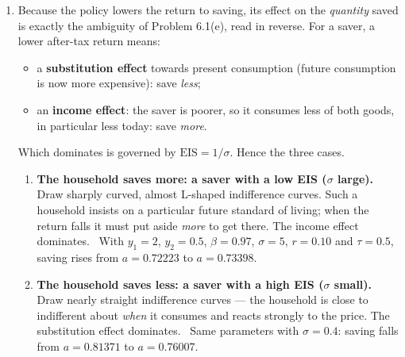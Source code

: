 \documentclass[12pt, letterpaper]{article}
\begin{document}
\begin{tcolorbox}[evenbox,title={Problem 6.6 \quad A Tax on Savings}]
\begin{enumerate}
\item Because the policy lowers the return to saving, its effect on the \emph{quantity}
saved is exactly the ambiguity of Problem 6.1(e), read in reverse. For a saver, a lower
after-tax return means:
\begin{itemize}[leftmargin=1.3em,itemsep=2pt,topsep=3pt]
\item a \textbf{substitution effect} towards present consumption (future consumption is now
      more expensive): save \emph{less};
\item an \textbf{income effect}: the saver is poorer, so it consumes less of both goods, in
      particular less today: save \emph{more}.
\end{itemize}
Which dominates is governed by $\mathrm{EIS}=1/\sigma$. Hence the three cases.

\begin{enumerate}[label=(\roman*),leftmargin=1.9em,itemsep=5pt,topsep=4pt]
\item \textbf{The household saves more: a saver with a low EIS ($\sigma$ large).} Draw
      sharply curved, almost L-shaped indifference curves. Such a household insists on a
      particular future standard of living; when the return falls it must put aside
      \emph{more} to get there. The income effect dominates.
      \checkmark\ With $y_1=2$, $y_2=0.5$, $\beta=0.97$, $\sigma=5$, $r=0.10$ and
      $\tau=0.5$, saving rises from $a=0.72223$ to $a=0.73398$.

\item \textbf{The household saves less: a saver with a high EIS ($\sigma$ small).} Draw
      nearly straight indifference curves --- the household is close to indifferent about
      \emph{when} it consumes and reacts strongly to the price. The substitution effect
      dominates.
      \checkmark\ Same parameters with $\sigma=0.4$: saving falls from $a=0.81371$ to
      $a=0.76007$.


\end{enumerate}
\end{enumerate}
\end{tcolorbox}
\end{document}
